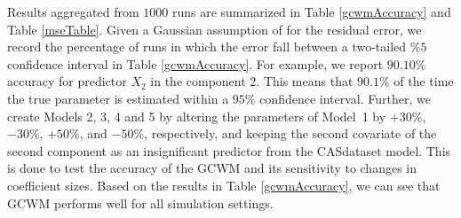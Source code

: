 \documentclass[12pt,letterpaper]{article}
\numberwithin{equation}{section}
\numberwithin{equation}{section}
\numberwithin{equation}{section}
\begin{document}
Results aggregated from $1000$ runs are summarized in Table \ref{gcwmAccuracy} and Table \ref{mseTable}. Given a Gaussian assumption of for the residual error, we record the percentage of runs in which the error fall between a two-tailed $\% 5$ confidence interval in Table \ref{gcwmAccuracy}. For example, we report $90.10\%$ accuracy for predictor $X_2$ in the component 2. This means that $90.1\%$ of the time the true parameter is estimated within a $95\%$ confidence interval. 
Further, we create Models 2, 3, 4 and 5 by altering the parameters of Model~1 by $+30\%$, $-30\%$, $+50\%$, and $-50\%$, respectively, and keeping the second covariate of the second component as an insignificant predictor from the CASdataset model. This is done to test the accuracy of the GCWM and its sensitivity to changes in coefficient sizes. Based on the results in Table \ref{gcwmAccuracy}, we can see that GCWM performs well for all simulation settings.
\end{document}
